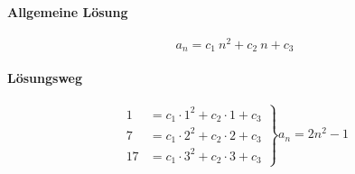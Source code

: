 \paragraph{Allgemeine Lösung}

\[
	a_n = c_1\ n^2 + c_2\ n + c_3
\]

\paragraph{Lösungsweg}

\[
	\left.
	\begin{array}{lcl}
		1  & = c_1 \cdot 1^2 + c_2 \cdot 1 + c_3 \\
		7  & = c_1 \cdot 2^2 + c_2 \cdot 2 + c_3 \\
		17 & = c_1 \cdot 3^2 + c_2 \cdot 3 + c_3
	\end{array}
	\right \}
	a_n = 2n^2 {-} 1
\]
